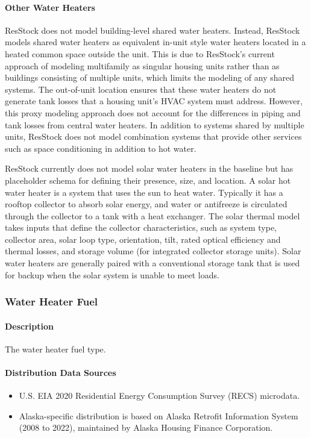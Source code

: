 \paragraph{Other Water Heaters}
ResStock does not model building-level shared water heaters. Instead, ResStock models shared water heaters as equivalent in-unit style water heaters located in a heated common space outside the unit. This is due to ResStock’s current approach of modeling multifamily as singular housing units rather than as buildings consisting of multiple units, which limits the modeling of any shared systems. The out-of-unit location ensures that these water heaters do not generate tank losses that a housing unit's HVAC system must address. However, this proxy modeling approach does not account for the differences in piping and tank losses from central water heaters. In addition to systems shared by multiple units, ResStock does not model combination systems that provide other services such as space conditioning in addition to hot water.

ResStock currently does not model solar water heaters in the baseline but has placeholder schema for defining their presence, size, and location. A solar hot water heater is a system that uses the sun to heat water. Typically it has a rooftop collector to absorb solar energy, and water or antifreeze is circulated through the collector to a tank with a heat exchanger. The solar thermal model takes inputs that define the collector characteristics, such as system type, collector area, solar loop type, orientation, tilt, rated optical efficiency and thermal losses, and storage volume (for integrated collector storage units). Solar water heaters are generally paired with a conventional storage tank that is used for backup when the solar system is unable to meet loads.

\subsubsection{Water Heater Fuel}\label{water_heater_fuel}
\paragraph{Description}
The water heater fuel type.

\paragraph{Distribution Data Sources}
\begin{itemize}
\item
  U.S. EIA 2020 Residential Energy Consumption Survey (RECS) microdata.
\item
  Alaska-specific distribution is based on Alaska Retrofit Information
  System (2008 to 2022), maintained by Alaska Housing Finance
  Corporation.
\end{itemize}

